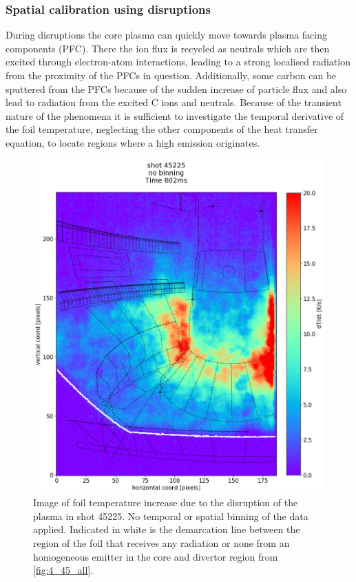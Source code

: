 \subsubsection{Spatial calibration using disruptions}

During disruptions the core plasma can quickly move towards plasma facing components (PFC). There the ion flux is recycled as neutrals which are then excited through electron-atom interactions, leading to a strong localised radiation from the proximity of the PFCs in question. Additionally, some carbon can be sputtered from the PFCs because of the sudden increase of particle flux and also lead to radiation from the excited C ions and neutrals. Because of the transient nature of the phenomena it is sufficient to investigate the temporal derivative of the foil temperature, neglecting the other components of the heat transfer equation, to locate regions where a high emission originates. %

\begin{figure}[!ht]
	\centering
	\includegraphics[width=0.65\linewidth,trim={0 0 0 80},clip]{Chapters/chapter2/figs/IRVB-MASTU_shot-45225_export_5.png}
	\caption{Image of foil temperature increase due to the disruption of the plasma in shot 45225. No temporal or spatial binning of the data applied. Indicated in white is the demarcation line between the region of the foil that receives any radiation or none from an homogeneous emitter in the core and divertor region from \autoref{fig:4_45_all}.}
	\label{fig:disruption}
\end{figure}

